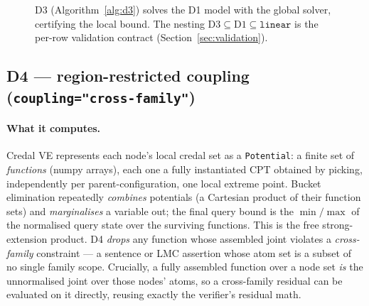 \documentclass[11pt]{article}
\begin{document}
\begin{figure}[t]
\centering
{}
\caption{D3 (Algorithm~\ref{alg:d3}) solves the D1 model with the global solver, certifying
  the local bound. The nesting $\text{D3}\subseteq\text{D1}\subseteq\texttt{linear}$ is the
  per-row validation contract (Section~\ref{sec:validation}).}
\label{fig:d3}
\end{figure}

\subsection{D4 --- region-restricted coupling (\texttt{coupling="cross-family"})}
\label{sec:d4-detail}

\paragraph{What it computes.} Credal VE represents each node's local credal set as a
\texttt{Potential}: a finite set of \emph{functions} (numpy arrays), each one a fully
instantiated CPT obtained by picking, independently per parent-configuration, one local
extreme point. Bucket elimination repeatedly \emph{combines} potentials (a Cartesian product
of their function sets) and \emph{marginalises} a variable out; the final query bound is the
$\min/\max$ of the normalised query state over the surviving functions. This is the free
strong-extension product. D4 \emph{drops} any function whose assembled joint violates a
\emph{cross-family} constraint --- a sentence or LMC assertion whose atom set is a subset of
no single family scope. Crucially, a fully assembled function over a node set \emph{is} the
unnormalised joint over those nodes' atoms, so a cross-family residual can be evaluated on it
directly, reusing exactly the verifier's residual math.
\end{document}
